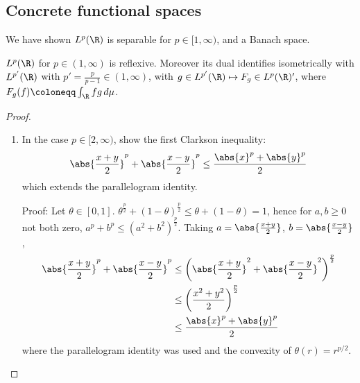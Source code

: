 \documentclass[twoside]{article}
\begin{document}
\subsection{Concrete functional spaces}
We have shown $L^p(\R)$ is separable for $p \in [1, \infty)$, and a Banach space.
\begin{thm}
    $L^p(\R)$ for $p \in (1, \infty)$ is reflexive.
    Moreover its dual identifies isometrically with $L^{p'}(\R)$ with $p' = \frac{p}{p-1} \in (1, \infty)$, with $g \in L^{p'}(\R) \mapsto F_g \in L^p(\R)'$, where $F_g(f) \coloneqq \int_\R f g \, d\mu$.
\end{thm}
\begin{proof}\leavevmode
  \begin{enumerate}[label=\arabic*)]
    \item In the case $p \in [2,\infty)$, show the first Clarkson inequality:
    \begin{equation*}
        \abs{\frac{x+y}{2}}^p + \abs{\frac{x-y}{2}}^p \leq \frac{\abs{x}^p + \abs{y}^p}{2}
    \end{equation*}
    which extends the parallelogram identity.

    Proof:
    Let $\theta \in [0, 1]$. $\theta^{\frac{p}{2}} + (1-\theta)^{\frac{p}{2}} \leq \theta + (1-\theta) = 1$, hence for $a, b \geq 0$ not both zero, $a^p + b^p \leq (a^2 + b^2)^{\frac{p}{2}}$.
    Taking $a = \abs{\frac{x+y}{2}}$, $b = \abs{\frac{x-y}{2}}$,
    \begin{align*}
        \abs{\frac{x+y}{2}}^p + \abs{\frac{x-y}{2}}^p &\leq \left(\abs{\frac{x+y}{2}}^2 + \abs{\frac{x-y}{2}}^2\right)^{\frac{p}{2}} \\
                                                      &\leq \left(\frac{x^2+y^2}{2}\right)^{\frac{p}{2}} \\
                                                      &\leq \frac{\abs{x}^p + \abs{y}^p}{2}
    \end{align*}
    where the parallelogram identity was used and the convexity of $\theta(r) = r^{p/2}$.


\end{enumerate}
\end{proof}
\end{document}
